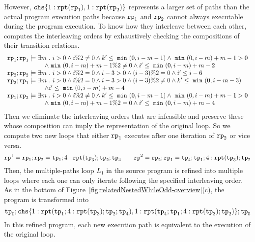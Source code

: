 However, $\rpchoose{1: \rprepeat(\rprog_1), 1:\rprepeat(\rprog_2)}$ represents a larger set of paths than the actual program execution paths because $\mathtt{rp}_1 $ and $\mathtt{rp}_2$ cannot always executable during the program execution.
To know how they interleave between each other, computes the interleaving orders
by exhaustively checking the compositions of their transition relations.
\begin{equation}
    \begin{array}{l}
        \mathtt{rp}_1 ; \mathtt{rp}_1 \models 
        \exists m ~.~  i > 0 \land  i \%2 \neq 0 \land k' \leq ~\mathtt{min}~(0, i - m - 1) \land ~\mathtt{min}~(0, i - m) + m - 1 > 0 \\
            \qquad \qquad \qquad \land ~\mathtt{min}~(0, i - m) + m - 1 \% 2 \neq 0 \land i' \leq  ~\mathtt{min}~(0, i - m) + m - 2 \\
        \mathtt{rp}_2 ; \mathtt{rp}_2 \models \exists m ~.~  i > 0 \land  i \%2 = 0 \land i - 3 > 0 \land (i - 3) \% 2 = 0 \land i' \leq i - 6  \\
        \mathtt{rp}_2 ; \mathtt{rp}_1 \models \exists m ~.~  i > 0 \land  i \%2 = 0 \land i - 3 > 0 \land (i - 3) \%2 \neq 0 \land k' \leq ~\mathtt{min}~(0, i - m - 3) \\
        \qquad \qquad \qquad 
        \land i' \leq ~\mathtt{min}~(0, i - m) + m - 4 \\
        \mathtt{rp}_1 ; \mathtt{rp}_2 \models \exists m ~.~  i > 0 \land  i \%2 \neq 0 \land k' \leq ~\mathtt{min}~(0, i - m - 1) \land ~\mathtt{min}~(0, i - m) + m - 1 > 0 \\
        \qquad \qquad \qquad \land ~\mathtt{min}~(0, i - m) + m - 1 \% 2 = 0 \land i' \leq  ~\mathtt{min}~(0, i - m) + m - 4
    \end{array}
\end{equation}
Then we eliminate the interleaving orders that are infeasible and preserve these whose composition can imply the
representation of the original loop.
So we compute two new loops that
either $\mathtt{rp}_1$ executes after one iteration of $\mathtt{rp}_2$ or vice versa.
\[
    \mathtt{rp}^1 = \mathtt{rp}_1 ; \mathtt{rp}_2 = \mathtt{tp}_1; 4:\mathtt{rpt}(\mathtt{tp}_3); \mathtt{tp}_2; \mathtt{tp}_4
    \qquad
    \mathtt{rp}^2 = \mathtt{rp}_2 ; \mathtt{rp}_1 = \mathtt{tp}_4; \mathtt{tp}_1; 4:\mathtt{rpt}(\mathtt{tp}_3); \mathtt{tp}_2
\]
Then, the multiple-paths loop $L_1$ in the source program is refined
into multiple loops where each one can only iterate following the specified interleaving order.
As in the bottom of Figure~\ref{fig:relatedNestedWhileOdd-overview}(c),
the program is transformed into 
\[
    \tpath_0 ; \rpchoose{ 1: \rprepeat(\tpath_1; 4:\rprepeat(\tpath_3); \tpath_2; \tpath_4), 
1: \rprepeat(\tpath_4; \tpath_1; 4:\rprepeat(\tpath_3); \tpath_2) }; \tpath_5
\]
In this refined program, 
each new execution path is equivalent to the execution of the original loop. 

